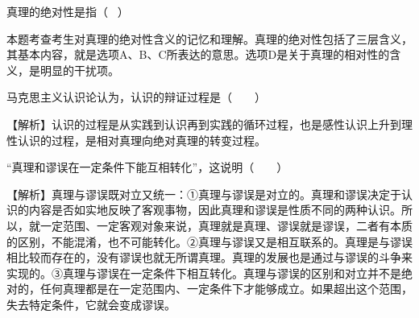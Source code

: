 \question 真理的绝对性是指（ ~）
\par{}
\begin{solution}本题考查考生对真理的绝对性含义的记忆和理解。真理的绝对性包括了三层含义，其基本内容，就是选项A、B、C所表达的意思。选项D是关于真理的相对性的含义，是明显的干扰项。
\end{solution}
\question 马克思主义认识论认为，认识的辩证过程是（　　）
\par{}
\begin{solution}【解析】认识的过程是从实践到认识再到实践的循环过程，也是感性认识上升到理性认识的过程，是相对真理向绝对真理的转变过程。
\end{solution}
\question ``真理和谬误在一定条件下能互相转化''，这说明（　　）
\par{}
\begin{solution}【解析】真理与谬误既对立又统一：①真理与谬误是对立的。真理和谬误决定于认识的内容是否如实地反映了客观事物，因此真理和谬误是性质不同的两种认识。所以，就一定范围、一定客观对象来说，真理就是真理、谬误就是谬误，二者有本质的区别，不能混淆，也不可能转化。②真理与谬误又是相互联系的。真理是与谬误相比较而存在的，没有谬误也就无所谓真理。真理的发展也是通过与谬误的斗争来实现的。③真理与谬误在一定条件下相互转化。真理与谬误的区别和对立并不是绝对的，任何真理都是在一定范围内、一定条件下才能够成立。如果超出这个范围，失去特定条件，它就会变成谬误。
\end{solution}
